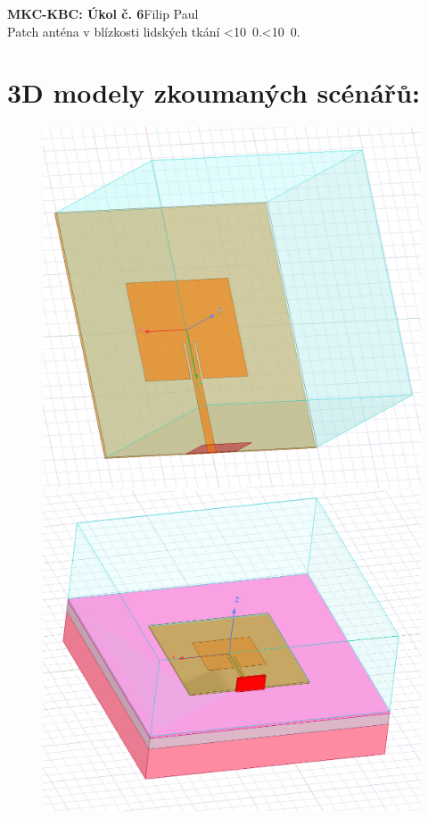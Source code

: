 \documentclass[10pt, a4paper]{article}%
\def\mydate{\leavevmode\hbox{\twodigits\day.\twodigits\month.\the\year}}
\def\twodigits#1{\ifnum#1<10 0\fi\the#1}
\begin{document}
\begin{flushleft}%
	\textbf{\Large{MKC-KBC: Úkol č. 6}}\hfill Filip Paul\\
	\large{Patch anténa v blízkosti lidských tkání \hfill\mydate}
\end{flushleft}

\section{\Large 3D modely zkoumaných scénářů:}
\begin{figure}[ht!]
	\centering
	\begin{minipage}{0.32\textwidth}
		\centering
		\includegraphics[width= 1\textwidth, height = 0.25\textheight]{3D_model_free_space.png}
	\end{minipage}%
	\hfill
	\begin{minipage}{0.32\textwidth}
		\centering
		\includegraphics[width= 1\textwidth,height = 0.25\textheight]{3D_model.png}

\end{minipage}
\end{figure}
\end{document}
